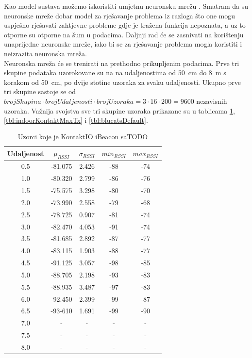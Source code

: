 Kao model sustava možemo iskoristiti umjetnu neuronsku mrežu .  
Smatram da su neuronske mreže dobar model za rješavanje problema iz razloga što one mogu uspješno rješavati zahtjevne probleme gdje je tražena funkcija nepoznata, a uz to otporne su otporne na šum u podacima. 
Daljnji rad će se zasnivati na korištenju unaprijedne neuronske mreže, iako bi se za rješavanje problema mogla koristiti i neizrazita neuronska mreža.
\\

Neuronska mreža će se trenirati na prethodno prikupljenim podacima. 
Prve tri skupine podataka uzorokovane su na na udaljenostima od \SI{50}{cm} do \SI{8}{m} s korakom od \SI{50}{cm}, po dvije stotine uzoraka za svaku udaljenosti. 
Ukupno prve tri skupine sastoje se od $brojSkupina \cdot brojUdaljenosti \cdot brojUzoraka = 3 \cdot 16 \cdot 200 = 9600$ nezavisnih uzoraka. 
Važnija svojstva sve tri skupine uzoraka prikazane su u tablicama \ref{tbl:indoorKontaktDefaultTx}, \ref{tbl:indoorKontaktMaxTx} i \ref{tbl:blucatsDefault}.

\begin{table}[H]
	\centering
	\caption{Uzorci koje je KontaktIO iBeacon saTODO}
	\label{tbl:indoorKontaktDefaultTx}
	\begin{tabular}{ccccc}
	\hline
	Udaljenost & $\mu_{RSSI}$ & $\sigma_{RSSI}$ & $min_{RSSI}$ & $max_{RSSI}$ \\
	\hline
	0.5 & -81.075 & 2.426 & -88 & -74 \\
	1.0 & -80.320 & 2.799 & -86 & -76 \\
	1.5 & -75.575 & 3.298 & -80 & -70 \\
	2.0 & -73.990 & 2.558 & -79 & -68 \\
	2.5 & -78.725 & 0.907 & -81 & -74 \\
	3.0 & -82.470 & 4.053 & -91 & -74 \\
	3.5 & -81.685 & 2.892 & -87 & -77 \\
	4.0 & -83.115 & 1.903 & -88 & -77 \\
	4.5 & -91.125 & 3.057 & -98 & -85 \\
	5.0 & -88.705 & 2.198 & -93 & -83 \\
	5.5 & -88.935 & 3.487 & -97 & -83 \\
	6.0 & -92.450 & 2.399 & -99 & -87 \\
	6.5 & -93-610 & 1.691 & -99 & -90 \\
	7.0 & - & - & - & - \\
	7.5 & - & - & - & - \\
	8.0 & - & - & - & - \\
	\hline
	\end{tabular}
\end{table}


